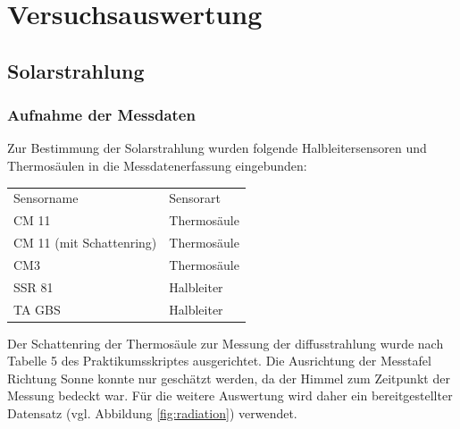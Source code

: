 \section{Versuchsauswertung}

\subsection{Solarstrahlung} 

\subsubsection{Aufnahme der Messdaten}
Zur Bestimmung der Solarstrahlung wurden folgende Halbleitersensoren und Thermosäulen in die Messdatenerfassung eingebunden:

\begin{center}
	
\begin{tabular}{ll}	
	\label{tab:Sensoren}
	Sensorname & Sensorart\\
	CM 11 & Thermosäule\\
	CM 11 (mit Schattenring) & Thermosäule\\
	CM3 & Thermosäule\\
	SSR 81 & Halbleiter\\
	TA GBS & Halbleiter
\end{tabular}
\end{center}

Der Schattenring der Thermosäule zur Messung der diffusstrahlung wurde nach Tabelle 5 des Praktikumsskriptes ausgerichtet. Die Ausrichtung der Messtafel Richtung Sonne konnte nur geschätzt werden, da der Himmel zum Zeitpunkt der Messung bedeckt war. Für die weitere Auswertung wird daher ein bereitgestellter Datensatz (vgl. Abbildung \ref{fig:radiation}) verwendet.

